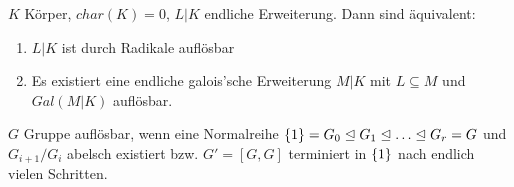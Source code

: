 \documentclass[../main.tex]{subfiles}
\begin{document}
\begin{theorem}\label{theo:3.25}
    $K$ Körper, $char(K)=0$, $L|K$ endliche Erweiterung. Dann sind äquivalent:
    \begin{enumerate}[label=(\roman*)]
        \item $L|K$ ist durch Radikale auflösbar
        \item Es existiert eine endliche galois'sche Erweiterung $M|K$ mit $L\subseteq M$ und $Gal(M|K)$ auflösbar.
    \end{enumerate}
\end{theorem}
\begin{reminder*}
    $G$ Gruppe auflösbar, wenn eine Normalreihe $\trivGO=G_0\nteq G_1 \nteq\dots\nteq G_r = G$ und $G_{i+1}/G_i$ abelsch existiert bzw. $G' = [G,G]$ terminiert in $\{1\}$ nach endlich vielen Schritten.
\end{reminder*}
\end{document}
